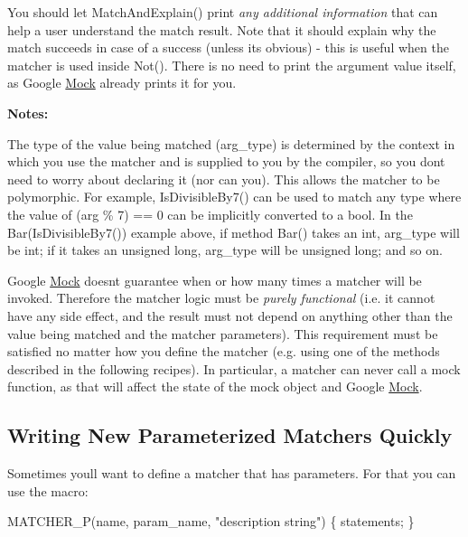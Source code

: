 You should let {\ttfamily Match\+And\+Explain()} print {\itshape any additional information} that can help a user understand the match result. Note that it should explain why the match succeeds in case of a success (unless it\textquotesingle{}s obvious) -\/ this is useful when the matcher is used inside {\ttfamily Not()}. There is no need to print the argument value itself, as Google \hyperlink{class_mock}{Mock} already prints it for you.

{\bfseries Notes\+:}


\begin{DoxyEnumerate}
\item The type of the value being matched ({\ttfamily arg\+\_\+type}) is determined by the context in which you use the matcher and is supplied to you by the compiler, so you don\textquotesingle{}t need to worry about declaring it (nor can you). This allows the matcher to be polymorphic. For example, {\ttfamily Is\+Divisible\+By7()} can be used to match any type where the value of {\ttfamily (arg \% 7) == 0} can be implicitly converted to a {\ttfamily bool}. In the {\ttfamily Bar(\+Is\+Divisible\+By7())} example above, if method {\ttfamily Bar()} takes an {\ttfamily int}, {\ttfamily arg\+\_\+type} will be {\ttfamily int}; if it takes an {\ttfamily unsigned long}, {\ttfamily arg\+\_\+type} will be {\ttfamily unsigned long}; and so on.
\end{DoxyEnumerate}
\begin{DoxyEnumerate}
\item Google \hyperlink{class_mock}{Mock} doesn\textquotesingle{}t guarantee when or how many times a matcher will be invoked. Therefore the matcher logic must be {\itshape purely functional} (i.\+e. it cannot have any side effect, and the result must not depend on anything other than the value being matched and the matcher parameters). This requirement must be satisfied no matter how you define the matcher (e.\+g. using one of the methods described in the following recipes). In particular, a matcher can never call a mock function, as that will affect the state of the mock object and Google \hyperlink{class_mock}{Mock}.
\end{DoxyEnumerate}

\subsection*{Writing New Parameterized Matchers Quickly}

Sometimes you\textquotesingle{}ll want to define a matcher that has parameters. For that you can use the macro\+: 
\begin{DoxyCode}
MATCHER\_P(name, param\_name, "description string") \{ statements; \}
\end{DoxyCode}


